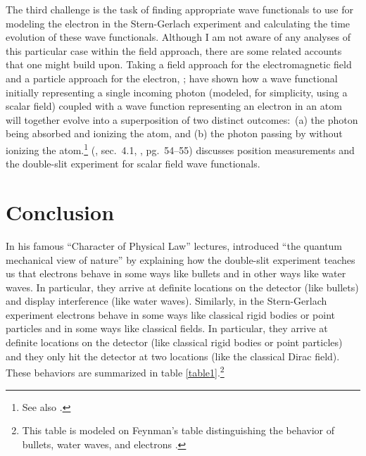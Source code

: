 \documentclass[12pt,secnumarabic,amsmath,amssymb,balancelastpage,nofootinbib]{article}
\begin{document}
The third challenge is the task of finding appropriate wave functionals to use for modeling the electron in the Stern-Gerlach experiment and calculating the time evolution of these wave functionals.  Although I am not aware of any analyses of this particular case within the field approach, there are some related accounts that one might build upon.  Taking a field approach for the electromagnetic field and a particle approach for the electron, \citet[sec.\ II.5]{bohm1987}; \citet[sec.\ 11.7]{bohmhiley} have shown how a wave functional initially representing a single incoming photon (modeled, for simplicity, using a scalar field) coupled with a wave function representing an electron in an atom will together evolve into a superposition of two distinct outcomes:\ (a) the photon being absorbed and ionizing the atom, and (b) the photon passing by without ionizing the atom.\footnote{See also \citet[sec.\ 4]{kaloyerou1994}.} \citeauthor{valentini1992} (\citeyear{valentini1992}, sec.\ 4.1, \citeyear{valentini1996}, pg.\ 54--55) discusses position measurements and the double-slit experiment for scalar field wave functionals.

\section{Conclusion}

In his famous ``Character of Physical Law'' lectures, \citet[ch.\ 6]{feynman} introduced ``the quantum mechanical view of nature'' by explaining how the double-slit experiment teaches us that electrons behave in some ways like bullets and in other ways like water waves.  In particular, they arrive at definite locations on the detector (like bullets) and display interference (like water waves).  Similarly, in the Stern-Gerlach experiment electrons behave in some ways like classical rigid bodies or point particles and in some ways like classical fields.  In particular, they arrive at definite locations on the detector (like classical rigid bodies or point particles) and they only hit the detector at two locations (like the classical Dirac field).  These behaviors are summarized in table \ref{table1}.\footnote{This table is modeled on Feynman's table distinguishing the behavior of bullets, water waves, and electrons \citep[figure 31]{feynman}.}
\end{document}
